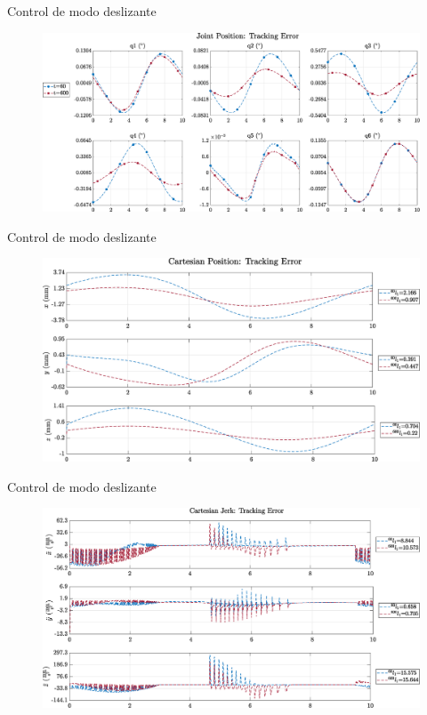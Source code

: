 \documentclass[10pt]{beamer} %
\begin{document}
	\begin{frame}[fragile]{Control de modo deslizante}
		\begin{figure}
			\centering
			\hspace*{-0.7cm}\includegraphics[width=1.1\textwidth]{img/SMCi/circular_traj/compare_seg/articular_SMCi_position_error_compare.eps}
		\end{figure}
	\end{frame}
	
	
	
	\begin{frame}[fragile]{Control de modo deslizante}
		\begin{figure}
			\centering
			\hspace*{-0.7cm}\includegraphics[width=1.1\textwidth]{img/SMCi/circular_traj/compare_seg/articular_SMCi_pos_xyz_error_compare.eps}
		\end{figure}
	\end{frame}
	
	
	\begin{frame}[fragile]{Control de modo deslizante}
		\begin{figure}
			\centering
			\hspace*{-0.5cm}\includegraphics[width=1.1\textwidth]{img/SMCi/circular_traj/compare_seg/articular_SMCi_jerk_xyz_error_compare.eps}
		\end{figure}
	\end{frame}
	


		
		
		
\end{document}
